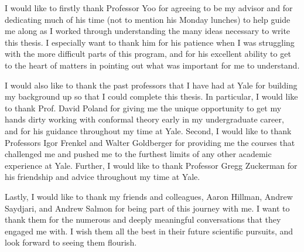 I would like to firstly thank Professor Yoo for agreeing to be my advisor and for dedicating much of his time (not to mention his Monday lunches) to help guide me along as I worked through understanding the many ideas necessary to write this thesis. I especially want to thank him for his patience when I was struggling with the more difficult parts of this program, and for his excellent ability to get to the heart of matters in pointing out what was important for me to understand.

I would also like to thank the past professors that I have had at Yale for building my background up so that I could complete this thesis. In particular, I would like to thank Prof. David Poland for giving me the unique opportunity to get my hands dirty working with conformal theory early in my undergraduate career, and for his guidance throughout my time at Yale. Second, I would like to thank Professors Igor Frenkel and Walter Goldberger for providing me the courses that challenged me and pushed me to the furthest limits of any other academic experience at Yale. Further, I would like to thank Professor Gregg Zuckerman for his friendship and advice throughout my time at Yale.

Lastly, I would like to thank my friends and colleagues, Aaron Hillman, Andrew Saydjari, and Andrew Salmon for being part of this journey with me. I want to thank them for the numerous and deeply meaningful conversations that they engaged me with. I wish them all the best in their future scientific pursuits, and look forward to seeing them flourish.